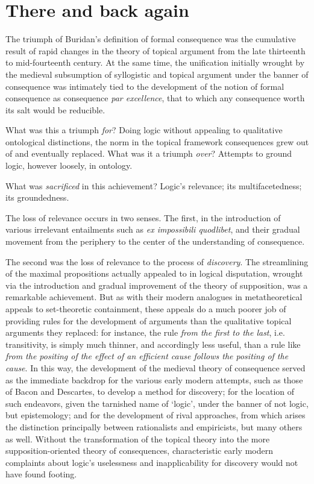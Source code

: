 \section{There and back again}
The triumph of Buridan's definition of formal consequence was the cumulative result of rapid changes in the theory of topical argument from the late thirteenth to mid-fourteenth century. At the same time, the unification initially wrought by the medieval subsumption of syllogistic and topical argument under the banner of consequence was intimately tied to the development of the notion of formal consequence as consequence \textit{par excellence}, that to which any consequence worth its salt would be reducible. 


What was this a triumph \textit{for}? Doing logic without appealing to qualitative ontological distinctions, the norm in the topical framework consequences grew out of and eventually replaced. What was it a triumph \textit{over}? Attempts to ground logic, however loosely, in ontology. 

What was \textit{sacrificed} in this achievement? Logic's relevance; its multifacetedness; its groundedness.

The loss of relevance occurs in two senses. The first, in the introduction of various irrelevant entailments such as \textit{ex impossibili quodlibet}, and their gradual movement from the periphery to the center of the understanding of consequence. 

The second was the loss of relevance to the process of \textit{discovery}. The streamlining of the maximal propositions actually appealed to in logical disputation, wrought via the introduction and gradual improvement of the theory of supposition, was a remarkable achievement. But as with their modern analogues in metatheoretical appeals to set-theoretic containment, these appeals do a much poorer job of providing rules for the development of arguments than the qualitative topical arguments they replaced: for instance, the rule \textit{from the first to the last}, i.e. transitivity, is simply much thinner, and accordingly less useful, than a rule like \textit{from the positing of the effect of an efficient cause follows the positing of the cause}. In this way, the development of the medieval theory of consequence served as the immediate backdrop for the various early modern attempts, such as those of Bacon and Descartes, to develop a method for discovery; for the location of such endeavors, given the tarnished name of `logic', under the banner of not logic, but epistemology; and for the development of rival approaches, from which arises the distinction principally between rationalists and empiricists, but many others as well. Without the transformation of the topical theory into the more supposition-oriented theory of consequences, characteristic early modern complaints about logic's uselessness and inapplicability for discovery would not have found footing. 

